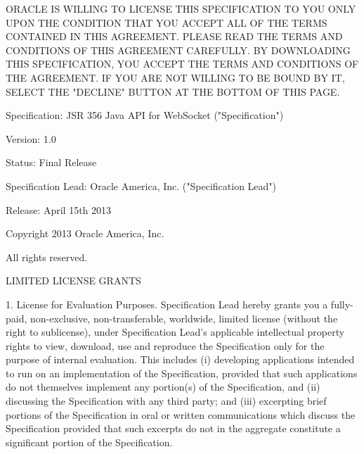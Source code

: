 ORACLE IS WILLING TO LICENSE THIS SPECIFICATION TO YOU ONLY UPON THE CONDITION THAT YOU ACCEPT ALL OF THE TERMS CONTAINED IN THIS AGREEMENT. PLEASE READ THE TERMS AND CONDITIONS OF THIS AGREEMENT CAREFULLY. BY DOWNLOADING THIS SPECIFICATION, YOU ACCEPT THE TERMS AND CONDITIONS OF THE AGREEMENT. IF YOU ARE NOT WILLING TO BE BOUND BY IT, SELECT THE "DECLINE" BUTTON AT THE BOTTOM OF THIS PAGE.


Specification:  JSR 356  Java API for WebSocket ("Specification")

Version:  1.0

Status:  Final Release

Specification Lead:  Oracle America, Inc. ("Specification Lead")

Release:  April 15th 2013 


Copyright 2013   Oracle America, Inc.

All rights reserved. 

LIMITED LICENSE GRANTS

1. License for Evaluation Purposes. Specification Lead hereby grants you a fully-paid, non-exclusive, non-transferable, worldwide, limited license (without the right to sublicense), under Specification Lead's  applicable intellectual property rights to view, download, use and reproduce the Specification only for the purpose of internal evaluation.  This includes (i) developing applications intended to run on an implementation of the Specification, provided that such applications do not themselves implement any portion(s) of the Specification, and (ii) discussing the Specification with any third party; and (iii) excerpting brief portions of the Specification in oral or written communications which discuss the Specification provided that such excerpts do not in the aggregate constitute a significant portion of the Specification.

